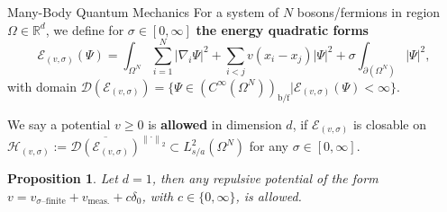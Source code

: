 \documentclass{beamer}[10]
\newcommand{\norm}[1]{\left\lVert #1 \right\rVert}
\newcommand{\abs}[1]{\left\lvert #1 \right\rvert}
\newcommand{\dom}[1]{\mathcal D\left(#1\right)}
\renewcommand{\braket}[1]{\left\langle#1\right\rangle}
\newcommand{\ie}{\emph{i.e.} }
\newcommand{\dd}{\partial }
\newcommand{\R}{\mathbb{R}}
\newtheorem{mproposition}{Proposition}
\newtheorem{mremark}{Remark}
\begin{document}
%


\begin{frame}{Many-Body Quantum Mechanics}
	\small
		For a system of $ N $ bosons/fermions in region $ \Omega\in\R^d $, we define for $ \sigma\in[0,\infty] $ \textbf{the energy quadratic forms}
		\begin{equation}\label{key}
			\mathcal{E}_{(v,\sigma)}(\Psi)=\int_{\Omega^N} \sum_{i=1}^{N}\abs{\nabla_i\Psi}^2+\sum_{i<j} v(x_i-x_j)\abs{\Psi}^2+\sigma\int_{\dd (\Omega^N)}\abs{\Psi}^2,
		\end{equation}
		with domain $ \dom{\mathcal{E}_{(v,\sigma)}}=\{\Psi\in (C^\infty(\Omega^N))_{\text{b/f}}\vert \mathcal{E}_{(v,\sigma)}(\Psi)<\infty\} $. 
\begin{definition}
	We say a potential $ v\geq 0 $ is \textbf{allowed} in dimension $ d $, if $ \mathcal{E}_{(v,\sigma)} $ is closable on $ \mathcal{H}_{(v,\sigma)}:=\overline{\dom{\mathcal{E}_{(v,\sigma)}}}^{\norm{\cdot}_2}\subset L^2_{s/a}(\Omega^N)$ for any $ \sigma\in[0,\infty] $.
\end{definition}
\begin{mproposition}\label{Lemma1dPotentialAllowed}
	Let $ d=1 $, then any repulsive potential of the form $v=v_{\sigma\text{--finite}}+v_{\text{meas.}}+c\delta_0 $, with $ c\in\{0,\infty\} $, is allowed.
\end{mproposition}
\end{frame}
\end{document}
